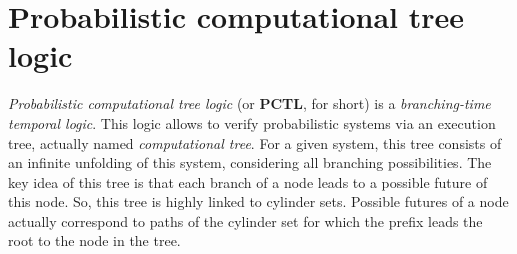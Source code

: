 \section{Probabilistic computational tree logic}
\textit{Probabilistic computational tree logic} (or \textbf{PCTL}, for short) is a \textit{branching-time temporal logic}.
This logic allows to verify probabilistic systems via an
execution tree, actually named \textit{computational tree}. For a given system, this tree consists of an infinite unfolding of this system, considering
all branching possibilities.
The key idea of this tree is that each branch of a node leads to a possible future of this node.
So, this tree is highly linked to cylinder sets.  Possible futures of a node actually correspond to paths of the cylinder set for which the prefix leads the root to the node in the tree.

